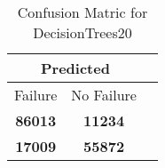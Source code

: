\begin{table}[] 
\caption{Confusion Matric for DecisionTrees20} 
\label{Table: Prediction Accuracy-DMDDecisionTrees20OnlySunEKF-ignoreReflection-Reflection} 
\centering 
\begin{tabular} 
 {@{}ccc@{}} 
\toprule 
\multicolumn{2}{c}{\textbf{Predicted}}
 \\ \midrule 
\multicolumn{1}{|c|}{Failure} & 
\multicolumn{1}{c|}{No Failure}
 \\ \midrule 
\multicolumn{1}{|c|}{\color{green}\textbf{86013}} & 
\multicolumn{1}{c|}{\color{red}\textbf{11234}}
 \\ \midrule 
\multicolumn{1}{|c|}{\color{red}\textbf{17009}} & 
\multicolumn{1}{c|}{\color{green}\textbf{55872}}
 \\ \bottomrule 
\end{tabular} 
\end{table} 
